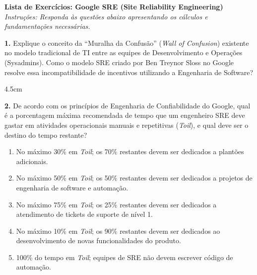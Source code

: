 \documentclass[12pt]{article}
\begin{document}

\vspace*{0.2cm}

\begin{center}
  {\Large \textbf{Lista de Exercícios: Google SRE (Site Reliability Engineering)}}\\[0.2cm]
  \textit{Instruções: Responda às questões abaixo apresentando os cálculos e fundamentações necessárias.}
\end{center}

\vspace{0.3cm}


\textbf{1.} Explique o conceito da ``Muralha da Confusão'' (\textit{Wall of Confusion}) existente no modelo tradicional de TI entre as equipes de Desenvolvimento e Operações (Sysadmins). Como o modelo SRE criado por Ben Treynor Sloss no Google resolve essa incompatibilidade de incentivos utilizando a Engenharia de Software?
\begin{resposta}{4.5cm}
\end{resposta}

\vspace{0.4cm}

\textbf{2.} De acordo com os princípios de Engenharia de Confiabilidade do Google, qual é a porcentagem máxima recomendada de tempo que um engenheiro SRE deve gastar em atividades operacionais manuais e repetitivas (\textit{Toil}), e qual deve ser o destino do tempo restante?
\begin{enumerate}[label=\alph*)]
    \item No máximo 30\% em \textit{Toil}; os 70\% restantes devem ser dedicados a plantões adicionais.
    \item No máximo 50\% em \textit{Toil}; os 50\% restantes devem ser dedicados a projetos de engenharia de software e automação.
    \item No máximo 75\% em \textit{Toil}; os 25\% restantes devem ser dedicados a atendimento de tickets de suporte de nível 1.
    \item No máximo 10\% em \textit{Toil}; os 90\% restantes devem ser dedicados ao desenvolvimento de novas funcionalidades do produto.
    \item 100\% do tempo em \textit{Toil}; equipes de SRE não devem escrever código de automação.
\end{enumerate}

\vspace{0.4cm}
\end{document}

